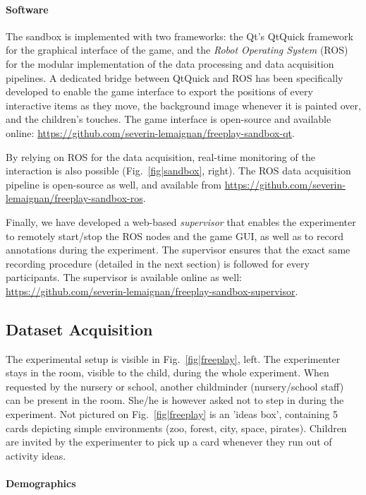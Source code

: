 \documentclass{article}
\begin{document}
\paragraph{Software}
The sandbox is implemented with two frameworks: the Qt's QtQuick framework
for the graphical interface of the game, and the \emph{Robot Operating System}
(ROS) for the modular implementation of the data processing and data acquisition
pipelines. A dedicated bridge between QtQuick and ROS has been specifically
developed to enable the game interface to export the positions of every
interactive items as they move, the background image whenever it is painted over,
and the children's touches. The game interface is open-source and available online:
\url{https://github.com/severin-lemaignan/freeplay-sandbox-qt}.

By relying on ROS for the data acquisition, real-time monitoring of the
interaction is also possible (Fig.~\ref{fig|sandbox}, right).
The ROS data acquisition pipeline is open-source as well, and available from
\url{https://github.com/severin-lemaignan/freeplay-sandbox-ros}.

Finally, we have developed a web-based \emph{supervisor} that enables the
experimenter to remotely start/stop the ROS nodes and the game GUI, as well as to
record annotations during the experiment. The supervisor ensures that the exact
same recording procedure (detailed in the next section) is followed for every
participants. The supervisor is available online as well:
\url{https://github.com/severin-lemaignan/freeplay-sandbox-supervisor}.

\subsection{Dataset Acquisition}

The experimental setup is visible in Fig.~\ref{fig|freeplay}, left.  The
experimenter stays in the room, visible to the child, during the whole
experiment. When requested by the nursery or school, another childminder
(nursery/school staff) can be present in the room. She/he is however asked not
to step in during the experiment. Not pictured on Fig.~\ref{fig|freeplay} is an
'ideas box', containing 5 cards depicting simple environments (zoo, forest,
city, space, pirates).  Children are invited by the experimenter to pick up a
card whenever they run out of activity ideas.

\paragraph{Demographics}
\end{document}
